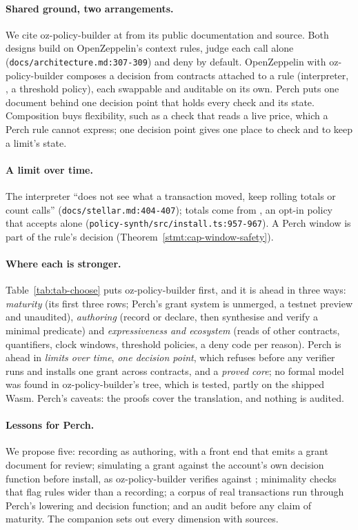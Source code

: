 \paragraph{Shared ground, two arrangements.} We cite oz-policy-builder at
 from its public documentation and source. Both designs build on OpenZeppelin's
context rules, judge each call alone (\nolinkurl{docs/architecture.md:307-309}) and
deny by default. OpenZeppelin with oz-policy-builder composes a decision from
contracts attached to a rule (interpreter, , a threshold
policy), each swappable and auditable on its own. Perch puts one document behind one decision
point that holds every check and its state.
Composition buys flexibility, such as a check that reads a live price, which a
Perch rule cannot express; one decision point gives one place to check and to
keep a limit's state.

\paragraph{A limit over time.} The interpreter ``does not see what a transaction
moved, keep rolling totals or count calls'' (\nolinkurl{docs/stellar.md:404-407});
totals come from , an opt-in policy that accepts
 alone (\nolinkurl{policy-synth/src/install.ts:957-967}). A
Perch window is part of the rule's decision (Theorem~\ref{stmt:cap-window-safety}).


\paragraph{Where each is stronger.} Table~\ref{tab:tab-choose} puts
oz-policy-builder first, and it is ahead in three ways: \emph{maturity} (its
first three rows; Perch's grant system is unmerged, a testnet preview and
unaudited), \emph{authoring} (record or declare, then synthesise and verify a
minimal predicate) and \emph{expressiveness and ecosystem} (reads of other contracts,
quantifiers, clock windows, threshold policies, a deny code per reason). Perch is ahead in \emph{limits over time}, \emph{one decision
point}, which refuses before any verifier runs and installs one grant across
contracts, and a \emph{proved core}; no formal model was found in
oz-policy-builder's tree, which is tested, partly on the shipped Wasm. Perch's
caveats: the proofs cover the translation, and nothing is audited.

\paragraph{Lessons for Perch.} We propose five: recording as authoring, with a
front end that emits a grant document for review; simulating a grant against
the account's own decision function before install, as oz-policy-builder
verifies against ; minimality checks that flag rules wider than a
recording; a corpus of real transactions run through Perch's lowering and
decision function; and an audit before any claim of maturity. The companion
sets out every dimension with sources.
